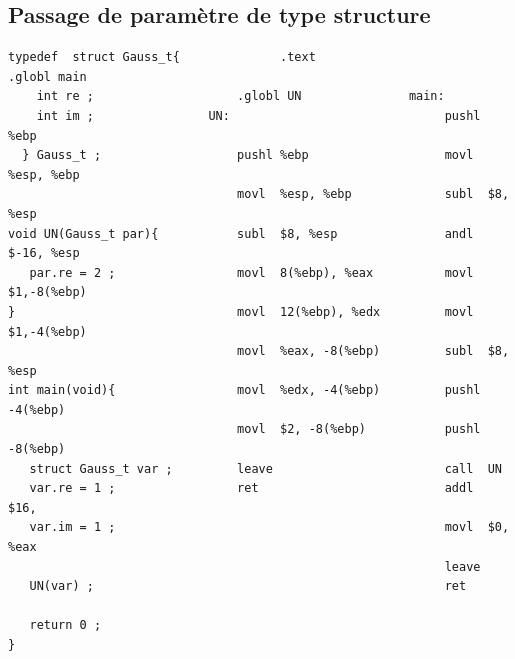 \begin{frame}
  \section{Passage de param\`etre de type structure}%
\begin{verbatim}
typedef  struct Gauss_t{              .text                      .globl main   
    int re ;                    .globl UN               main:             
    int im ;                UN:                              pushl   %ebp    
  } Gauss_t ;                   pushl %ebp                   movl  %esp, %ebp  
                                movl  %esp, %ebp             subl  $8, %esp    
void UN(Gauss_t par){           subl  $8, %esp               andl  $-16, %esp  
   par.re = 2 ;                 movl  8(%ebp), %eax          movl  $1,-8(%ebp) 
}                               movl  12(%ebp), %edx         movl  $1,-4(%ebp) 
                                movl  %eax, -8(%ebp)         subl  $8, %esp   
int main(void){                 movl  %edx, -4(%ebp)         pushl -4(%ebp)    
                                movl  $2, -8(%ebp)           pushl -8(%ebp)    
   struct Gauss_t var ;         leave                        call  UN      
   var.re = 1 ;                 ret                          addl  $16,
   var.im = 1 ;                                              movl  $0, %eax   
                                                             leave         
   UN(var) ;                                                 ret             

   return 0 ;
}                         
\end{verbatim}
\end{frame}
